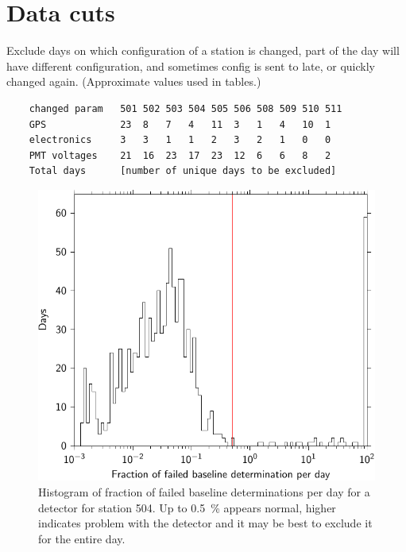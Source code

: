 \section{Data cuts}


Exclude days on which configuration of a station is changed, part of the day will have different configuration, and sometimes config is sent to late, or quickly changed again. (Approximate values used in tables.)

\begin{verbatim}
    changed param   501 502 503 504 505 506 508 509 510 511
    GPS             23  8   7   4   11  3   1   4   10  1
    electronics     3   3   1   1   2   3   2   1   0   0
    PMT voltages    21  16  23  17  23  12  6   6   8   2
    Total days      [number of unique days to be excluded]
\end{verbatim}

\begin{figure}
    \centering
    \includegraphics[width=0.7\linewidth]{plots/dataset/histogram_failed_baseline_504_4.pdf}
    \caption{Histogram of fraction of failed baseline determinations per day for a detector for station 504. Up to \SI{0.5}{\percent} appears normal, higher indicates problem with the detector and it may be best to exclude it for the entire day.}
    \label{fig:bad_baseline}
\end{figure}


